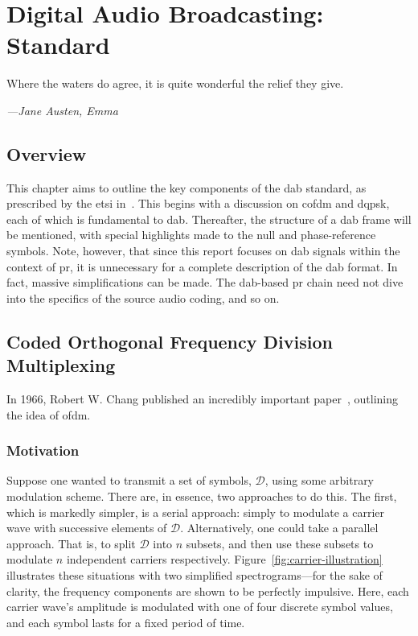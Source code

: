 \documentclass[class=report,11pt,crop=false]{standalone}
\begin{document}
\ifstandalone
\tableofcontents
\fi
\chapter{Digital Audio Broadcasting: Standard}
\epigraph{Where the waters do agree, it is quite wonderful the relief they give.}%
{\emph{---Jane Austen, Emma}}

\section{Overview}
This chapter aims to outline the key components of the \gls{dab} standard, as prescribed by the \gls{etsi} in~\cite{dabstandard}. This begins with a discussion on \gls{cofdm} and \gls{dqpsk}, each of which is fundamental to \gls{dab}. Thereafter, the structure of a \gls{dab} frame will be mentioned, with special highlights made to the null and phase-reference symbols. Note, however, that since this report focuses on \gls{dab} signals within the context of \gls{pr}, it is unnecessary for a complete description of the \gls{dab} format. In fact, massive simplifications can be made. The \gls{dab}-based \gls{pr} chain need not dive into the specifics of the source audio coding, and so on.

\section{Coded Orthogonal Frequency Division Multiplexing}
In 1966, Robert W. Chang published an incredibly important paper~\cite{Chang1966}, outlining the idea of \gls{ofdm}.

\subsection{Motivation}
Suppose one wanted to transmit a set of symbols, \(\mathcal{D}\), using some arbitrary modulation scheme. There are, in essence, two approaches to do this. The first, which is markedly simpler, is a serial approach: simply to modulate a carrier wave with successive elements of \(\mathcal{D}\). Alternatively, one could take a parallel approach. That is, to split \(\mathcal{D}\) into \(n\) subsets, and then use these subsets to modulate \(n\) independent carriers respectively. Figure~\ref{fig:carrier-illustration} illustrates these situations with two simplified spectrograms---for the sake of clarity, the frequency components are shown to be perfectly impulsive. Here, each carrier wave's amplitude is modulated with one of four discrete symbol values, and each symbol lasts for a fixed period of time.
\end{document}
